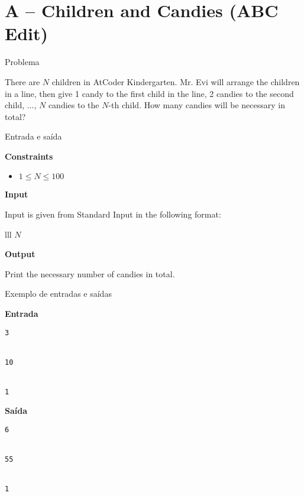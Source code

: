 \section{A -- Children and Candies (ABC Edit)}

\begin{frame}[fragile]{Problema}

There are $N$ children in AtCoder Kindergarten. Mr. Evi will arrange the children in a line, then
give 1 candy to the first child in the line, 2 candies to the second child, ..., $N$ candies to the 
$N$-th child. How many candies will be necessary in total?

\end{frame}

\begin{frame}[fragile]{Entrada e saída}

\textbf{Constraints}

\begin{itemize}
    \item $1\leq N\leq 100$
\end{itemize}

\vspace{0.1in}

\textbf{Input}

Input is given from Standard Input in the following format:
\begin{atcoderio}{lll}
$N$ \\
\end{atcoderio}

\textbf{Output}

Print the necessary number of candies in total.

\end{frame}

\begin{frame}[fragile]{Exemplo de entradas e saídas}

\begin{minipage}[t]{0.45\textwidth}
\textbf{Entrada}
\begin{verbatim}
3


10


1
\end{verbatim}
\end{minipage}
\begin{minipage}[t]{0.5\textwidth}
\textbf{Saída}
\begin{verbatim}
6


55


1
\end{verbatim}
\end{minipage}
\end{frame}

